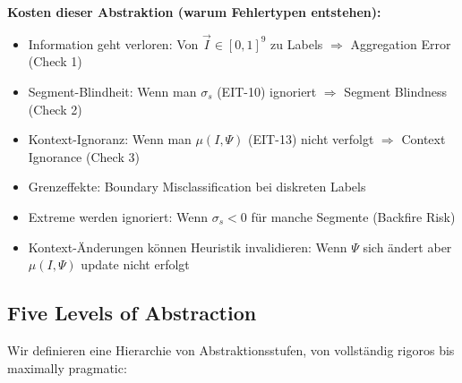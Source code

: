 \begin{tcolorbox}[colback=red!5!white, colframe=red!75!black, title=\textbf{Das Kernproblem: Kontinuität vs. Praktikabilität}]
\textbf{Kosten dieser Abstraktion (warum Fehlertypen entstehen):}
\begin{itemize}[nosep]
\item Information geht verloren: Von $\vec{I} \in [0,1]^9$ zu Labels $\Rightarrow$ Aggregation Error (Check 1)
\item Segment-Blindheit: Wenn man $\sigma_s$ (EIT-10) ignoriert $\Rightarrow$ Segment Blindness (Check 2)
\item Kontext-Ignoranz: Wenn man $\mu(I, \Psi)$ (EIT-13) nicht verfolgt $\Rightarrow$ Context Ignorance (Check 3)
\item Grenzeffekte: Boundary Misclassification bei diskreten Labels
\item Extreme werden ignoriert: Wenn $\sigma_s < 0$ für manche Segmente (Backfire Risk)
\item Kontext-Änderungen können Heuristik invalidieren: Wenn $\Psi$ sich ändert aber $\mu(I, \Psi)$ update nicht erfolgt
\end{itemize}

\end{tcolorbox}

\subsection{Five Levels of Abstraction}
\label{subsec:20-abstraction-levels}

Wir definieren eine Hierarchie von Abstraktionsstufen, von vollständig rigoros bis maximally pragmatic:

